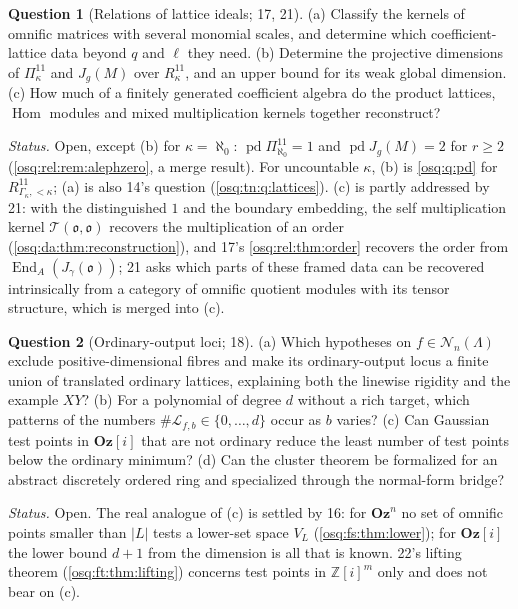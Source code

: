\documentclass[11pt,letterpaper]{article}
\numberwithin{equation}{section}
\theoremstyle{definition}
\newtheorem{question}[question]{Question}
\theoremstyle{remark}
\theoremstyle{plain}
\newcommand{\Oz}{\mathbf{Oz}}
\newcommand{\GOz}{\Oz[i]}
\newcommand{\Z}{\mathbb Z}
\newcommand{\Hom}{\operatorname{Hom}}
\newcommand{\End}{\operatorname{End}}
\newcommand{\pd}{\operatorname{pd}}
\newcommand{\Num}{\mathscr N}
\begin{document}
\begin{question}[Relations of lattice ideals; 17, 21]\label{osq:rel:q:relations}
(a) Classify the kernels of omnific matrices with several monomial scales, and determine which coefficient-lattice data beyond $q$ and
$\ell$ they need. (b) Determine the projective dimensions of $\Pi^{11}_\kappa$ and $J_g(M)$ over $R^{11}_\kappa$, and an upper bound for its weak
global dimension. (c) How much of a finitely generated coefficient algebra do the product lattices, $\Hom$ modules and mixed
multiplication kernels together reconstruct?
\end{question}
\emph{Status.} Open, except (b) for $\kappa=\aleph_0$: $\pd\Pi^{11}_{\aleph_0}=1$ and $\pd J_g(M)=2$ for $r\ge2$ (\cref{osq:rel:rem:alephzero}, a merge
result). For uncountable $\kappa$, (b) is \cref{osq:q:pd} for $R^{11}_{\Gamma_\kappa,<\kappa}$; (a) is also 14's question (\cref{osq:tn:q:lattices}).
(c) is partly addressed by 21: with the distinguished $1$ and the boundary embedding, the self multiplication kernel
$\mathcal T(\mathfrak o,\mathfrak o)$ recovers the multiplication of an order (\cref{osq:da:thm:reconstruction}), and 17's
\cref{osq:rel:thm:order} recovers the order from $\End_A(J_\gamma(\mathfrak o))$; 21 asks which parts of these framed data can be recovered
intrinsically from a category of omnific quotient modules with its tensor structure, which is merged into (c).

\begin{question}[Ordinary-output loci; 18]\label{osq:or:q:outputs}
(a) Which hypotheses on $f\in\Num_n(\Lambda)$ exclude positive-dimensional fibres and make its ordinary-output locus a finite union of
translated ordinary lattices, explaining both the linewise rigidity and the example $XY$? (b) For a polynomial of degree $d$ without a rich
target, which patterns of the numbers $\#\mathcal L_{f,b}\in\{0,\dots,d\}$ occur as $b$ varies? (c) Can Gaussian test points in $\GOz$
that are not ordinary reduce the least number of test points below the ordinary minimum? (d) Can the cluster theorem be formalized for
an abstract discretely ordered ring and specialized through the normal-form bridge?
\end{question}
\emph{Status.} Open. The real analogue of (c) is settled by 16: for $\Oz^n$ no set of omnific points smaller than $|L|$ tests a
lower-set space $V_L$ (\cref{osq:fs:thm:lower}); for $\GOz$ the lower bound $d+1$ from the dimension is all that is known. 22's lifting theorem
(\cref{osq:ft:thm:lifting}) concerns test points in $\Z[i]^m$ only and does not bear on (c).
\end{document}
